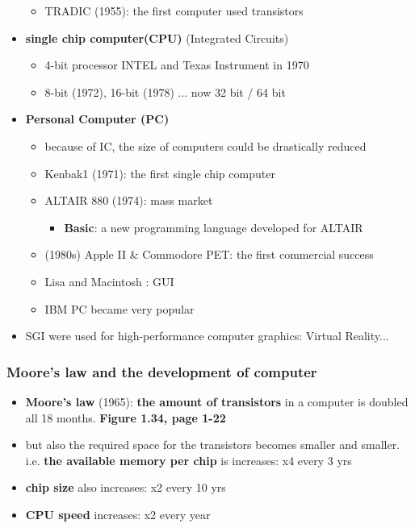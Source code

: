 \documentclass{standalone}
\begin{document}
\begin{itemize}
\begin{itemize}
			\item TRADIC (1955): the first computer used transistors
		\end{itemize}   
	\item \textbf{single chip computer(CPU)} (Integrated Circuits) 
		\begin{itemize}
			\item 4-bit processor INTEL and Texas Instrument in 1970
			\item 8-bit (1972), 16-bit (1978) ... now 32 bit / 64 bit
		\end{itemize}
	\item \textbf{Personal Computer (PC)}
		\begin{itemize}
			\item because of IC, the size of computers could be drastically reduced
			\item Kenbak1 (1971): the first single chip computer
			\item ALTAIR 880 (1974): mass market
				\begin{itemize}
					\item \textbf{Basic}: a new programming language developed for ALTAIR
				\end{itemize}
			\item (1980s) Apple II \& Commodore PET: the first commercial success
			\item Lisa and Macintosh : GUI
			\item IBM PC became very popular
		\end{itemize}
	\item SGI were used for high-performance computer graphics: Virtual Reality...
\end{itemize}

\subsubsection*{Moore's law and the development of computer}

\begin{itemize}
	\item \textbf{Moore's law} (1965): \textbf{the amount of transistors} in a computer is doubled all 18 months. \textbf{Figure 1.34, page 1-22}
	\item but also the required space for the transistors becomes smaller and smaller. i.e. \textbf{the available memory per chip} is increases: x4 every 3 yrs
	\item \textbf{chip size} also increases: x2 every 10 yrs 
	\item \textbf{CPU speed} increases: x2 every year
\end{itemize}
\end{document}
